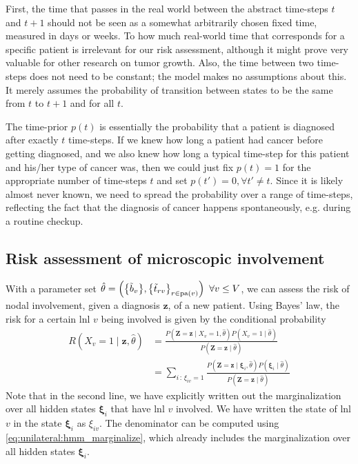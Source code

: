 \documentclass[\relativeRoot/main.tex]{subfiles}
\begin{document}
First, the time that passes in the real world between the abstract time-steps $t$ and $t+1$ should not be seen as a somewhat arbitrarily chosen fixed time, measured in days or weeks. To how much real-world time that corresponds for a specific patient is irrelevant for our risk assessment, although it might prove very valuable for other research on tumor growth. Also, the time between two time-steps does not need to be constant; the model makes no assumptions about this. It merely assumes the probability of transition between states to be the same from $t$ to $t+1$ and for all $t$.

The time-prior $p(t)$ is essentially the probability that a patient is diagnosed after exactly $t$ time-steps. If we knew how long a patient had cancer before getting diagnosed, and we also knew how long a typical time-step for this patient and his/her type of cancer was, then we could just fix $p(t)=1$ for the appropriate number of time-steps $t$ and set $p(t') = 0, \forall t' \neq t$. Since it is likely almost never known, we need to spread the probability over a range of time-steps, reflecting the fact that the diagnosis of cancer happens spontaneously, e.g. during a routine checkup.

\subsection{Risk assessment of microscopic involvement}
\label{subsec:unilateral:formalism:risk_assessment}

With a parameter set $\hat{\theta} = \left( \big\{ \Tilde{b}_v \big\}, \big\{ \Tilde{t}_{rv} \big\}_{r \in \operatorname{pa}(v)} \right) \ \forall v \leq V$, we can assess the risk of nodal involvement, given a diagnosis $\mathbf{z}$, of a new patient. Using Bayes' law, the risk for a certain \gls{lnl} $v$ being involved is given by the conditional probability
%
\begin{equation} \label{eq:unilateral:sampling:risk}
    \begin{aligned}
        R \left( X_v=1 \mid \mathbf{z}, \hat{\theta} \right) 
        &= \frac{P \left( \mathbf{Z}=\mathbf{z} \mid X_v=1, \hat{\theta} \right) P \left( X_v=1 \mid \hat{\theta} \right)}{P \left( \mathbf{Z}=\mathbf{z} \mid \hat{\theta} \right)} \\
        &= \sum_{i\,:\,\xi_{iv}=1}{\frac{P \left( \mathbf{Z}=\mathbf{z} \mid \boldsymbol{\xi}_i , \hat{\theta} \right) P \left( \boldsymbol{\xi}_i \mid \hat{\theta} \right)}{P \left( \mathbf{Z}=\mathbf{z} \mid \hat{\theta} \right)}}
    \end{aligned}
\end{equation}
%
Note that in the second line, we have explicitly written out the marginalization over all hidden states $\boldsymbol{\xi}_i$ that have \gls{lnl} $v$ involved. We have written the state of \gls{lnl} $v$ in the state $\boldsymbol{\xi}_i$ as $\xi_{iv}$. The denominator can be computed using \cref{eq:unilateral:hmm_marginalize}, which already includes the marginalization over all hidden states $\boldsymbol{\xi}_i$.
\end{document}
